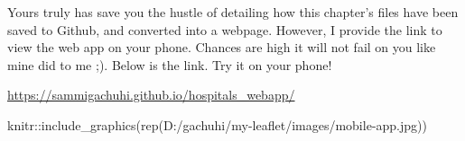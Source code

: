 \documentclass[
]{book}
\newenvironment{Shaded}{\begin{snugshade}}{\end{snugshade}}
\newcommand{\FunctionTok}[1]{\textcolor[rgb]{0.00,0.00,0.00}{#1}}
\newcommand{\NormalTok}[1]{#1}
\newcommand{\SpecialCharTok}[1]{\textcolor[rgb]{0.00,0.00,0.00}{#1}}
\newcommand{\StringTok}[1]{\textcolor[rgb]{0.31,0.60,0.02}{#1}}
\begin{document}
Yours truly has save you the hustle of detailing how this chapter's files have been saved to Github, and converted into a webpage. However, I provide the link to view the web app on your phone. Chances are high it will not fail on you like mine did to me ;). Below is the link. Try it on your phone!

\url{https://sammigachuhi.github.io/hospitals_webapp/}

\begin{Shaded}
\begin{Highlighting}[]
\NormalTok{knitr}\SpecialCharTok{::}\FunctionTok{include\_graphics}\NormalTok{(}\FunctionTok{rep}\NormalTok{(}\StringTok{\textquotesingle{}D:/gachuhi/my{-}leaflet/images/mobile{-}app.jpg\textquotesingle{}}\NormalTok{))}
\end{Highlighting}
\end{Shaded}
\end{document}
